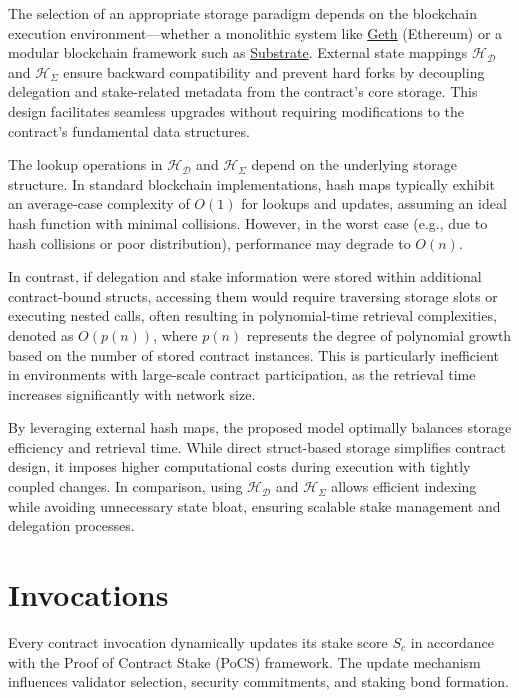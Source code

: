 \documentclass{article}
\begin{document}
The selection of an appropriate storage paradigm depends on the blockchain execution environment—whether a monolithic system like \href{https://geth.ethereum.org/}{Geth} (Ethereum) or a modular blockchain framework such as \href{https://substrate.io}{Substrate}. External state mappings $\mathcal{H}_\mathcal{D}$ and $\mathcal{H}_\Sigma$ ensure backward compatibility and prevent hard forks by decoupling delegation and stake-related metadata from the contract's core storage. This design facilitates seamless upgrades without requiring modifications to the contract's fundamental data structures.

The lookup operations in $\mathcal{H}_\mathcal{D}$ and $\mathcal{H}_\Sigma$ depend on the underlying storage structure. In standard blockchain implementations, hash maps typically exhibit an average-case complexity of $O(1)$ for lookups and updates, assuming an ideal hash function with minimal collisions. However, in the worst case (e.g., due to hash collisions or poor distribution), performance may degrade to $O(n)$.  

In contrast, if delegation and stake information were stored within additional contract-bound structs, accessing them would require traversing storage slots or executing nested calls, often resulting in polynomial-time retrieval complexities, denoted as $O(p(n))$, where $p(n)$ represents the degree of polynomial growth based on the number of stored contract instances. This is particularly inefficient in environments with large-scale contract participation, as the retrieval time increases significantly with network size.

By leveraging external hash maps, the proposed model optimally balances storage efficiency and retrieval time. While direct struct-based storage simplifies contract design, it imposes higher computational costs during execution with tightly coupled changes. In comparison, using $\mathcal{H}_\mathcal{D}$ and $\mathcal{H}_\Sigma$ allows efficient indexing while avoiding unnecessary state bloat, ensuring scalable stake management and delegation processes.

\section{Invocations}  

Every contract invocation dynamically updates its stake score $S_c$ in accordance with the Proof of Contract Stake (PoCS) framework. The update mechanism influences validator selection, security commitments, and staking bond formation.  
\end{document}
